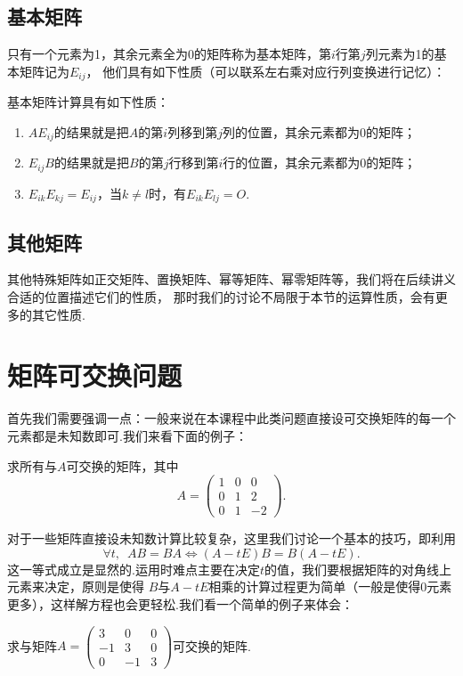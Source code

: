 \subsection{基本矩阵}
只有一个元素为1，其余元素全为0的矩阵称为基本矩阵，第$i$行第$j$列元素为1的基本矩阵记为$E_{ij}$，
他们具有如下性质（可以联系左右乘对应行列变换进行记忆）：
\begin{theorem}
    基本矩阵计算具有如下性质：
    \begin{enumerate}
        \item $AE_{ij}$的结果就是把$A$的第$i$列移到第$j$列的位置，其余元素都为0的矩阵；

        \item $E_{ij}B$的结果就是把$B$的第$j$行移到第$i$行的位置，其余元素都为0的矩阵；

        \item $E_{ik}E_{kj}=E_{ij}$，当$k \neq l$时，有$E_{ik}E_{lj}=O$.
    \end{enumerate}
\end{theorem}

\subsection{其他矩阵}
其他特殊矩阵如正交矩阵、置换矩阵、幂等矩阵、幂零矩阵等，我们将在后续讲义合适的位置描述它们的性质，
那时我们的讨论不局限于本节的运算性质，会有更多的其它性质.

\section{矩阵可交换问题}
首先我们需要强调一点：一般来说在本课程中此类问题直接设可交换矩阵的每一个元素都是未知数即可.我们来看下面的例子：
\begin{example}
    求所有与$A$可交换的矩阵，其中
    \[A=\begin{pmatrix}
        1 & 0 & 0 \\ 0 & 1 & 2 \\ 0 & 1 & -2
    \end{pmatrix}.\]
\end{example}

对于一些矩阵直接设未知数计算比较复杂，这里我们讨论一个基本的技巧，即利用
\[\forall t,\enspace AB=BA \iff (A-tE)B=B(A-tE).\]
这一等式成立是显然的.运用时难点主要在决定$t$的值，我们要根据矩阵的对角线上元素来决定，原则是使得
$B$与$A-tE$相乘的计算过程更为简单（一般是使得0元素更多），这样解方程也会更轻松.我们看一个简单的例子来体会：
\begin{example}
    求与矩阵$A=\begin{pmatrix}
        3 & 0 & 0 \\ -1 & 3 & 0 \\ 0 & -1 & 3
    \end{pmatrix}$可交换的矩阵.
\end{example}
\begin{solution}

\end{solution}

